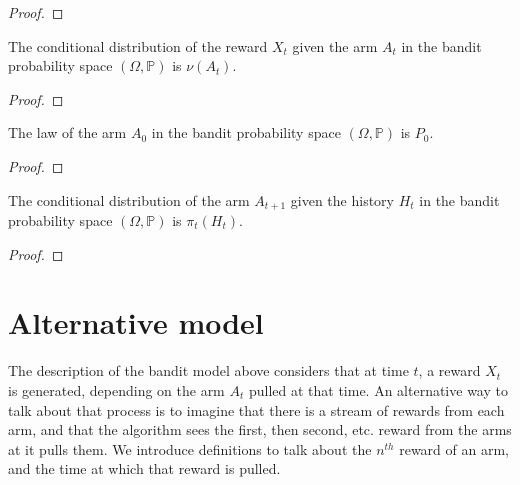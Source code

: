 \begin{proof}

\end{proof}


\begin{lemma}\label{lem:condDistrib_reward}
  \leanok
The conditional distribution of the reward $X_t$ given the arm $A_t$ in the bandit probability space $(\Omega, \mathbb{P})$ is $\nu(A_t)$.
\end{lemma}

\begin{proof}\leanok

\end{proof}


\begin{lemma}\label{lem:law_arm_zero}
  \leanok
The law of the arm $A_0$ in the bandit probability space $(\Omega, \mathbb{P})$ is $P_0$.
\end{lemma}

\begin{proof}\leanok

\end{proof}


\begin{lemma}\label{lem:condDistrib_arm}
  \leanok
The conditional distribution of the arm $A_{t+1}$ given the history $H_t$ in the bandit probability space $(\Omega, \mathbb{P})$ is $\pi_t(H_t)$.
\end{lemma}

\begin{proof}\leanok

\end{proof}



\section{Alternative model}\label{sec:alt_model}

The description of the bandit model above considers that at time $t$, a reward $X_t$ is generated, depending on the arm $A_t$ pulled at that time.
An alternative way to talk about that process is to imagine that there is a stream of rewards from each arm, and that the algorithm sees the first, then second, etc. reward from the arms at it pulls them.
We introduce definitions to talk about the $n^{th}$ reward of an arm, and the time at which that reward is pulled.

